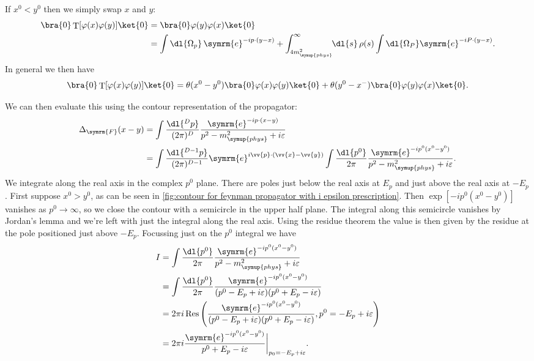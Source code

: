 \documentclass[fleqn]{NotesClass}
\newcommand{\e}{\symrm{e}}
\DeclareMathOperator{\Res}{Res}
\newcommand{\heaviside}{\theta}
\DeclareMathOperator{\timeOrdering}{T}
\newcommand{\feynman}{\symrm{F}}
\newcommand{\phys}{\symup{phys}}
\begin{document}
    If \(x^0 < y^0\) then we simply swap \(x\) and \(y\):
    \begin{align}
        \bra{0} \timeOrdering[\varphi(x) \varphi(y)]\ket{0} &= \bra{0} \varphi(y) \varphi(x) \ket{0}\\
        &= \int \dl{\Omega_p} \, \e^{-ip\cdot(y - x)} + \int_{4m_{\phys}^2}^{\infty} \!\! \dl{s} \, \rho(s) \int \dl{\Omega_P} \e^{-iP\cdot (y - x)}.\notag
    \end{align}
    In general we then have
    \begin{equation}
        \bra{0} \timeOrdering[\varphi(x) \varphi(y)] \ket{0} = \heaviside(x^0 - y^0) \bra{0} \varphi(x) \varphi(y) \ket{0} + \heaviside(y^0 - x^-) \bra{0} \varphi(y) \varphi(x) \ket{0}.
    \end{equation}
    
    We can then evaluate this using the contour representation of the propagator:
    \begin{align}
        \Delta_{\feynman}(x - y) &= \int \frac{\dl{^Dp}}{(2\pi)^D} \frac{\e^{-ip\cdot (x - y)}}{p^2 - m_{\phys}^2 + i\varepsilon}\\
        &= \int \frac{\dl{^{D-1}p}}{(2\pi)^{D-1}} \e^{i\vv{p} \cdot (\vv{x} - \vv{y})} \int \frac{\dl{p^0}}{2\pi} \frac{\e^{-ip^0(x^0 - y^0)}}{p^2 - m_{\phys}^2 + i\varepsilon}.
    \end{align}
    We integrate along the real axis in the complex \(p^0\) plane.
    There are poles just below the real axis at \(E_p\) and just above the real axis at \(-E_p\).
    First suppose \(x^0 > y^0\), as can be seen in \cref{fig:contour for feynman propagator with i epsilon prescription}.
    Then \(\exp[-ip^0(x^0 - y^0)]\) vanishes as \(p^0 \to \infty\), so we close the contour with a semicircle in the upper half plane.
    The integral along this semicircle vanishes by Jordan's lemma and we're left with just the integral along the real axis.
    Using the residue theorem the value is then given by the residue at the pole positioned just above \(-E_p\).
    Focussing just on the \(p^0\) integral we have
    \begin{align}
        I &= \int \frac{\dl{p^0}}{2\pi} \frac{\e^{-ip^0(x^0 - y^0)}}{p^2 - m_{\phys}^2 + i\varepsilon}\\
        &= \int \frac{\dl{p^0}}{2\pi} \frac{\e^{-ip^0(x^0 - y^0)}}{(p^0 - E_p + i\varepsilon)(p^0 + E_p - i\varepsilon)}\\
        &= 2\pi i \Res\left( \frac{\e^{-ip^0(x^0 - y^0)}}{(p^0 - E_p + i\varepsilon)(p^0 + E_p - i\varepsilon)}, p^0 = -E_p + i\varepsilon \right)\\
        &= 2\pi i \frac{\e^{-ip^0(x^0 - y^0)}}{p^0 + E_p - i\varepsilon} \bigg|_{p_0 = -E_p + i\varepsilon}.
    \end{align}
\end{document}
